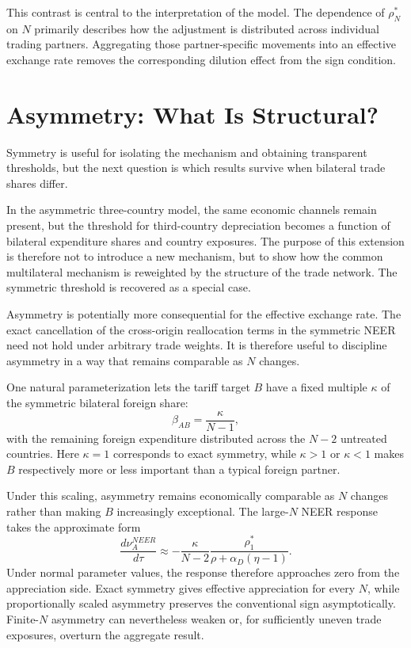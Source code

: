 \documentclass[11pt]{article}
\begin{document}
This contrast is central to the interpretation of the model. The dependence of $\rho_N^*$ on $N$ primarily describes how the adjustment is distributed across individual trading partners. Aggregating those partner-specific movements into an effective exchange rate removes the corresponding dilution effect from the sign condition.

\section{Asymmetry: What Is Structural?}

Symmetry is useful for isolating the mechanism and obtaining transparent thresholds, but the next question is which results survive when bilateral trade shares differ.

In the asymmetric three-country model, the same economic channels remain present, but the threshold for third-country depreciation becomes a function of bilateral expenditure shares and country exposures. The purpose of this extension is therefore not to introduce a new mechanism, but to show how the common multilateral mechanism is reweighted by the structure of the trade network. The symmetric threshold is recovered as a special case.

Asymmetry is potentially more consequential for the effective exchange rate. The exact cancellation of the cross-origin reallocation terms in the symmetric NEER need not hold under arbitrary trade weights. It is therefore useful to discipline asymmetry in a way that remains comparable as $N$ changes.

One natural parameterization lets the tariff target $B$ have a fixed multiple $\kappa$ of the symmetric bilateral foreign share:
\[
\beta_{AB}
=
\frac{\kappa}{N-1},
\]
with the remaining foreign expenditure distributed across the $N-2$ untreated countries. Here $\kappa=1$ corresponds to exact symmetry, while $\kappa>1$ or $\kappa<1$ makes $B$ respectively more or less important than a typical foreign partner.

Under this scaling, asymmetry remains economically comparable as $N$ changes rather than making $B$ increasingly exceptional. The large-$N$ NEER response takes the approximate form
\[
\frac{d\nu_A^{NEER}}{d\tau}
\approx
-\frac{\kappa}{N-2}
\frac{\rho_1^*}
{\rho+\alpha_D(\eta-1)}.
\]
Under normal parameter values, the response therefore approaches zero from the appreciation side. Exact symmetry gives effective appreciation for every $N$, while proportionally scaled asymmetry preserves the conventional sign asymptotically. Finite-$N$ asymmetry can nevertheless weaken or, for sufficiently uneven trade exposures, overturn the aggregate result.
\end{document}
